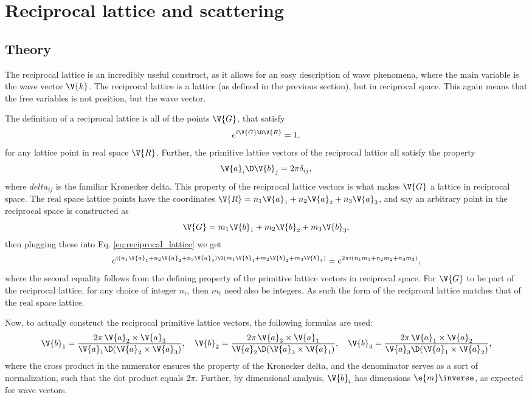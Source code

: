 \documentclass[main.tex]{subfiles}
\begin{document}
	\section{Reciprocal lattice and scattering}
	\subsection{Theory}
	The reciprocal lattice is an incredibly useful construct, as it allows for an easy description of wave phenomena, where the main variable is the wave vector $ \V{k} $. The reciprocal lattice is a lattice (as defined in the previous section), but in reciprocal space. This again means that the free variables is not position, but the wave vector.
	
	The definition of a reciprocal lattice is all of the points $ \V{G} $, that satisfy
	\begin{equation}\label{eq:reciprocal_lattice}
		e^{i \V{G} \D \V{R}} = 1,
	\end{equation}
	for any lattice point in real space $ \V{R} $. Further, the primitive lattice vectors of the reciprocal lattice all satisfy the property
	\begin{equation}\label{key}
		\V{a}_i \D \V{b}_j = 2\pi \delta_{ij},
	\end{equation}
	where $ delta_{ij} $ is the familiar Kronecker delta. This property of the reciprocal lattice vectors is what makes $ \V{G} $ a lattice in reciprocal space. The real space lattice points have the coordinates $ \V{R} = n_1 \V{a}_1 + n_2 \V{a}_2 + n_3 \V{a}_3 $, and say an arbitrary point in the reciprocal space is constructed as
	\begin{equation}\label{key}
		\V{G} = m_1 \V{b}_1 + m_2 \V{b}_2 + m_3 \V{b}_3,
	\end{equation}
	then plugging these into Eq. \eqref{eq:reciprocal_lattice} we get
	\begin{equation}\label{key}
		e^{i (n_1 \V{a}_1 + n_2 \V{a}_2 + n_3 \V{a}_3) \D (m_1 \V{b}_1 + m_2 \V{b}_2 + m_3 \V{b}_3)} = e^{2\pi i (n_1 m_1 + n_2 m_2 + n_3 m_3)},
	\end{equation}
	where the second equality follows from the defining property of the primitive lattice vectors in reciprocal space. For $ \V{G} $ to be part of the reciprocal lattice, for any choice of integer $ n_i $, then $ m_i $ need also be integers. As such the form of the reciprocal lattice matches that of the real space lattice.
	
	Now, to actually construct the reciprocal primitive lattice vectors, the following formulas are used:
	\begin{equation}\label{key}
		\V{b}_1 = \frac{2\pi \, \V{a}_2 \times \V{a}_3}{\V{a}_1 \D (\V{a}_2 \times \V{a}_3)}, \quad \V{b}_2 = \frac{2\pi \, \V{a}_3 \times \V{a}_1}{\V{a}_2 \D (\V{a}_3 \times \V{a}_1)}, \quad \V{b}_3 = \frac{2\pi \, \V{a}_1 \times \V{a}_2}{\V{a}_3 \D (\V{a}_1 \times \V{a}_2)},
	\end{equation}
	where the cross product in the numerator ensures the property of the Kronecker delta, and the denominator serves as a sort of normalization, such that the dot product equals 2$ \pi $. Further, by dimensional analysis, $ \V{b}_i $ has dimensions $ \e{m}\inverse $, as expected for wave vectors.
	
\end{document}
